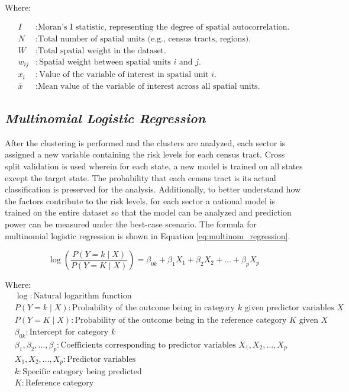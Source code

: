 Where:

\begin{align*}
I & : \text{Moran's I statistic, representing the degree of spatial autocorrelation.} \\
N & : \text{Total number of spatial units (e.g., census tracts, regions).} \\
W & : \text{Total spatial weight in the dataset.} \\
w_{ij} & : \text{Spatial weight between spatial units \(i\) and \(j\).} \\
x_i & : \text{Value of the variable of interest in spatial unit \(i\).} \\
\bar{x} & : \text{Mean value of the variable of interest across all spatial units.}
\end{align*}




\subsection{\textit{Multinomial Logistic Regression}}

After the clustering is performed and the clusters are analyzed, each sector is assigned a new variable containing the risk levels for each census tract. Cross split validation is used wherein for each state, a new model is trained on all states except the target state. The probability that each census tract is its actual classification is preserved for the analysis. Additionally, to better understand how the \hs factors contribute to the risk levels, for each sector a national model is trained on the entire dataset so that the model can be analyzed and prediction power can be measured under the best-case scenario. The formula for multinomial logistic regression is shown in Equation \ref{eq:multinom_regression}.

\begin{equation}\label{eq:multinom_regression}
    \log\left(\frac{{P(Y = k \mid X)}}{{P(Y = K \mid X)}}\right) = \beta_{0k} + \beta_1 X_1 + \beta_2 X_2 + \dots + \beta_p X_p
\end{equation}

Where:
\begin{align*}
    & \log: \text{Natural logarithm function} \\
    & P(Y = k \mid X): \text{Probability of the outcome being in category \(k\) given predictor variables \(X\)} \\
    & P(Y = K \mid X): \text{Probability of the outcome being in the reference category \(K\) given \(X\)} \\
    & \beta_{0k}: \text{Intercept for category \(k\)} \\
    & \beta_1, \beta_2, \dots, \beta_p: \text{Coefficients corresponding to predictor variables \(X_1, X_2, \dots, X_p\)} \\
    & X_1, X_2, \dots, X_p: \text{Predictor variables} \\
    & k: \text{Specific category being predicted} \\
    & K: \text{Reference category}
\end{align*}

\endinput